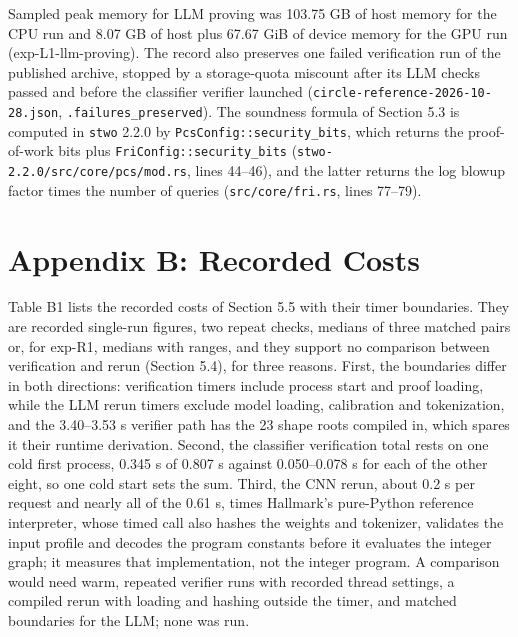 \documentclass[11pt]{article}
\begin{document}
Sampled peak memory for LLM proving was 103.75 GB of host memory for the CPU run and 8.07 GB of host plus 67.67 GiB of device memory for the GPU run (exp-L1-llm-proving). The record also preserves one failed verification run of the published archive, stopped by a storage-quota miscount after its LLM checks passed and before the classifier verifier launched (\texttt{circle-\allowbreak{}reference-\allowbreak{}2026-\allowbreak{}10-\allowbreak{}28.\allowbreak{}json}, \texttt{.\allowbreak{}failures\_\allowbreak{}preserved}). The soundness formula of Section 5.3 is computed in \texttt{stwo} 2.2.0 by \texttt{PcsConfig::\allowbreak{}security\_bits}, which returns the proof-of-work bits plus \texttt{FriConfig::\allowbreak{}security\_bits} (\texttt{stwo-\allowbreak{}2.\allowbreak{}2.\allowbreak{}0/\allowbreak{}src/\allowbreak{}core/\allowbreak{}pcs/\allowbreak{}mod.\allowbreak{}rs}, lines 44--46), and the latter returns the log blowup factor times the number of queries (\texttt{src/\allowbreak{}core/\allowbreak{}fri.\allowbreak{}rs}, lines 77--79).

\section*{Appendix B: Recorded Costs}

Table B1 lists the recorded costs of Section 5.5 with their timer boundaries. They are recorded single-run figures, two repeat checks, medians of three matched pairs or, for exp-R1, medians with ranges, and they support no comparison between verification and rerun (Section 5.4), for three reasons. First, the boundaries differ in both directions: verification timers include process start and proof loading, while the LLM rerun timers exclude model loading, calibration and tokenization, and the 3.40--3.53 s verifier path has the 23 shape roots compiled in, which spares it their runtime derivation. Second, the classifier verification total rests on one cold first process, 0.345 s of 0.807 s against 0.050--0.078 s for each of the other eight, so one cold start sets the sum. Third, the CNN rerun, about 0.2 s per request and nearly all of the 0.61 s, times Hallmark's pure-Python reference interpreter, whose timed call also hashes the weights and tokenizer, validates the input profile and decodes the program constants before it evaluates the integer graph; it measures that implementation, not the integer program. A comparison would need warm, repeated verifier runs with recorded thread settings, a compiled rerun with loading and hashing outside the timer, and matched boundaries for the LLM; none was run.
\end{document}

